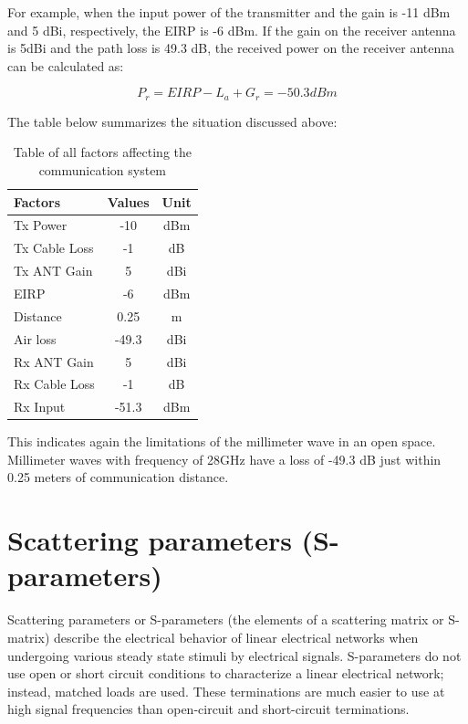 \documentclass[a4paper,12pt]{report}
\begin{document}
For example, when the input power of the transmitter and the gain is -11 dBm and 5 dBi,
respectively, the EIRP is -6 dBm.
If the gain on the receiver antenna is 5dBi and
the path loss is 49.3 dB,
the received power on the receiver antenna can be calculated as:

\begin{equation}
  P_r = EIRP - L_{a} + G_r = -50.3 dBm
\end{equation}

The table below summarizes the situation discussed above:

\begin{table}[h]
  \centering
  \caption{Table of all factors affecting the communication system}
  \label{table:communication_system_factors}
  \begin{tabular}[]{lcc}
    \hline
    Factors & Values & Unit \\
    \hline\hline
    Tx Power & -10 & dBm \\
    \hline
    Tx Cable Loss & -1 & dB \\
    \hline
    Tx ANT Gain & 5 & dBi \\
    \hline
    EIRP & -6 & dBm \\
    \hline
    Distance & 0.25 & m \\
    \hline
    Air loss & -49.3 & dBi \\
    \hline
    Rx ANT Gain & 5 & dBi \\
    \hline
    Rx Cable Loss & -1 & dB \\
    \hline
    \hline
    Rx Input & -51.3 & dBm \\
    \hline
  \end{tabular}
\end{table}

This indicates again the limitations of the millimeter wave in an open space.
Millimeter waves with frequency of 28GHz have a loss of -49.3 dB
just within 0.25 meters of communication distance.

\section{Scattering parameters (S-parameters)}

Scattering parameters or S-parameters
(the elements of a scattering matrix or S-matrix)
describe the electrical behavior of linear electrical networks
when undergoing various steady state stimuli by electrical signals.
S-parameters do not use open or short circuit conditions to
characterize a linear electrical network;
instead, matched loads are used.
These terminations are much easier to use at high signal frequencies
than open-circuit and short-circuit terminations.
\end{document}
